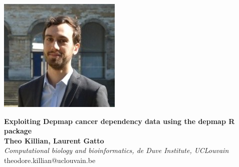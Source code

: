 \documentclass{article}
\title{}
\author{}
\date{}
\begin{document}


\begin{center}
\colorbox{lgray}{
  \begin{minipage}{3cm}
    \includegraphics[width=1.2\linewidth]{figs/theo_killian_crop.jpg}
  \end{minipage}
  \begin{minipage}{.74\textwidth}
    \begin{center}
      \huge \textbf{Exploiting Depmap cancer dependency data using the depmap R package} \\
      \vspace{0.4cm}
      \Large \textbf{Theo Killian, Laurent Gatto} \\
      \Large \textit{Computational biology and bioinformatics, de Duve Institute, UCLouvain } \\
      \vspace{0.4cm}
      \normalsize theodore.killian@uclouvain.be \\
    \end{center}
  \end{minipage}
  \begin{minipage}{3.7cm}

\end{minipage}}
\end{center}
\end{document}
